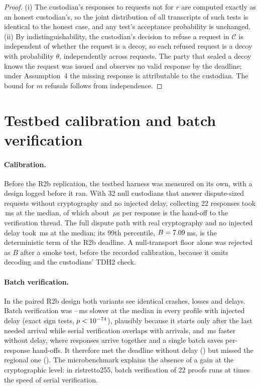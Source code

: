 \documentclass[11pt]{article}
\begin{document}
\begin{proof}
(i) The custodian's responses to requests not for $r$ are computed exactly as an honest custodian's, so the joint distribution of all transcripts of such tests is identical to the honest case, and any test's acceptance probability is unchanged. (ii) By indistinguishability, the custodian's decision to refuse a request in $\mathcal{C}$ is independent of whether the request is a decoy, so each refused request is a decoy with probability $\theta$, independently across requests. The party that sealed a decoy knows the request was issued and observes no valid response by the deadline; under Assumption~4 the missing response is attributable to the custodian. The bound for $m$ refusals follows from independence.
\end{proof}

\section{Testbed calibration and batch verification}

\paragraph{Calibration.} Before the R2b replication, the testbed harness was measured on its own, with a design logged before it ran. With 32 null custodians that answer dispute-sized requests without cryptography and no injected delay, collecting 22 responses took \RtwobNullMed\,ms at the median, of which about \RtwobHandoffUs\,$\mu$s per response is the hand-off to the verification thread. The full dispute path with real cryptography and no injected delay took \RtwobCalibMed\,ms at the median; its 99th percentile, $B=7.09$\,ms, is the deterministic term of the R2b deadline. A null-transport floor alone was rejected as $B$ after a smoke test, before the recorded calibration, because it omits decoding and the custodians' TDH2 check.

\paragraph{Batch verification.} In the paired R2b design both variants see identical crashes, losses and delays. Batch verification was \RtwobBatchSlowLo--\RtwobBatchSlowHi\,ms slower at the median in every profile with injected delay (exact sign tests, $p<10^{-74}$), plausibly because it starts only after the last needed arrival while serial verification overlaps with arrivals, and \RtwobBatchFastZero\,ms faster without delay, where responses arrive together and a single batch saves per-response hand-offs. It therefore met the deadline without delay (\RtwobControlBatch) but missed the regional one (\RtwobRegionalBatch). The microbenchmark explains the absence of a gain at the cryptographic level: in ristretto255, batch verification of 22 proofs runs at \RtwoBatchRis{} times the speed of serial verification.
\end{document}

